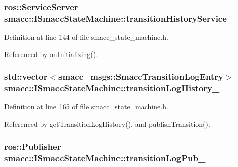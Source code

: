 \subsubsection[{\texorpdfstring{transition\+History\+Service\+\_\+}{transitionHistoryService_}}]{\setlength{\rightskip}{0pt plus 5cm}ros\+::\+Service\+Server smacc\+::\+I\+Smacc\+State\+Machine\+::transition\+History\+Service\+\_\+\hspace{0.3cm}{\ttfamily [protected]}}\hypertarget{classsmacc_1_1ISmaccStateMachine_a73e2a7ca89c3d807eafe5cfb1e86ea05}{}\label{classsmacc_1_1ISmaccStateMachine_a73e2a7ca89c3d807eafe5cfb1e86ea05}


Definition at line 144 of file smacc\+\_\+state\+\_\+machine.\+h.



Referenced by on\+Initializing().

\subsubsection[{\texorpdfstring{transition\+Log\+History\+\_\+}{transitionLogHistory_}}]{\setlength{\rightskip}{0pt plus 5cm}std\+::vector$<$smacc\+\_\+msgs\+::\+Smacc\+Transition\+Log\+Entry$>$ smacc\+::\+I\+Smacc\+State\+Machine\+::transition\+Log\+History\+\_\+\hspace{0.3cm}{\ttfamily [private]}}\hypertarget{classsmacc_1_1ISmaccStateMachine_af682d5fce5bb7c959e2b8814dae50023}{}\label{classsmacc_1_1ISmaccStateMachine_af682d5fce5bb7c959e2b8814dae50023}


Definition at line 165 of file smacc\+\_\+state\+\_\+machine.\+h.



Referenced by get\+Transition\+Log\+History(), and publish\+Transition().

\subsubsection[{\texorpdfstring{transition\+Log\+Pub\+\_\+}{transitionLogPub_}}]{\setlength{\rightskip}{0pt plus 5cm}ros\+::\+Publisher smacc\+::\+I\+Smacc\+State\+Machine\+::transition\+Log\+Pub\+\_\+\hspace{0.3cm}{\ttfamily [protected]}}\hypertarget{classsmacc_1_1ISmaccStateMachine_acc42eb050325c1edc77d81675fb1286a}{}\label{classsmacc_1_1ISmaccStateMachine_acc42eb050325c1edc77d81675fb1286a}


